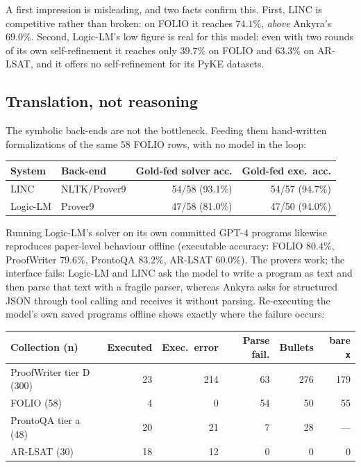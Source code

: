 \documentclass[11pt,a4paper]{article}
\begin{document}
A first impression is misleading, and two facts confirm this. First, LINC is competitive
rather than broken: on FOLIO it reaches $74.1\%$, \emph{above} Ankyra's $69.0\%$. Second,
Logic-LM's low figure is real for this model: even with two rounds of its own
self-refinement it reaches only $39.7\%$ on FOLIO and $63.3\%$ on AR-LSAT, and it offers no
self-refinement for its PyKE datasets.

\subsection{Translation, not reasoning}
\label{sec:comparison-translation}

The symbolic back-ends are not the bottleneck. Feeding them hand-written formalizations of
the same 58 FOLIO rows, with no model in the loop:

\begin{center}
\small
\begin{tabular}{llrr}
\toprule
\textbf{System} & \textbf{Back-end} & \textbf{Gold-fed solver acc.} & \textbf{Gold-fed exe.\ acc.} \\
\midrule
LINC & NLTK/Prover9 & 54/58 (93.1\%) & 54/57 (94.7\%) \\
Logic-LM & Prover9 & 47/58 (81.0\%) & 47/50 (94.0\%) \\
\bottomrule
\end{tabular}
\end{center}

Running Logic-LM's solver on its own committed GPT-4 programs likewise reproduces
paper-level behaviour offline (executable accuracy: FOLIO $80.4\%$, ProofWriter $79.6\%$,
ProntoQA $83.2\%$, AR-LSAT $60.0\%$). The provers work; the interface fails: Logic-LM and
LINC ask the model to write a program as text and then parse that text with a fragile
parser, whereas Ankyra asks for structured JSON through tool calling and receives it without
parsing. Re-executing the model's own saved programs offline shows exactly where the failure
occurs:

\begin{center}
\small
\begin{tabular}{lrrrrr}
\toprule
\textbf{Collection (n)} & \textbf{Executed} & \textbf{Exec.\ error} & \textbf{Parse fail.} & \textbf{Bullets} & \textbf{bare \texttt{x}} \\
\midrule
ProofWriter tier D (300) & 23 & 214 & 63 & 276 & 179 \\
FOLIO (58) & 4 & 0 & 54 & 50 & 55 \\
ProntoQA tier a (48) & 20 & 21 & 7 & 28 & --- \\
AR-LSAT (30) & 18 & 12 & 0 & 0 & 0 \\
\bottomrule
\end{tabular}
\end{center}
\end{document}
